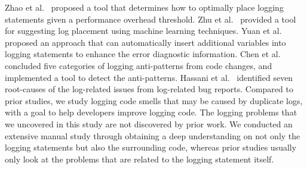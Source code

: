 

Zhao et al.~\cite{Zhao:2017:LFA:3132747.3132778} proposed a tool that determines how to optimally place logging statements given a performance overhead threshold. Zhu et al.~\cite{Zhu:2015:LLH:2818754.2818807} provided a tool for suggesting log placement using machine learning techniques. %
Yuan et al.~\cite{Yuan:2011:ISD:1950365.1950369} proposed an approach that can automatically insert additional variables into logging statements to enhance the error diagnostic information. Chen et al.~\cite{log_pattern_ICSE2017} concluded five categories of logging anti-patterns from code changes, and implemented a tool to detect the anti-patterns. Hassani et al.~\cite{mehran_emse_2018} identified seven root-causes of the log-related issues from log-related bug reports. Compared to prior studies, we study logging code smells that may be caused by duplicate logs, with a goal to help developers improve logging code. The logging problems that we uncovered in this study are not discovered by prior work. We conducted an extensive manual study through obtaining a deep understanding on not only the logging statements but also the surrounding code, whereas prior studies usually only look at the problems that are related to the logging statement itself. %




